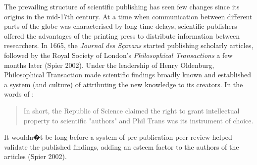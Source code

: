 \documentclass[final,authoryear,3p]{elsarticle-open-drafting}
\begin{document}
The prevailing structure of scientific publishing has seen few changes since its origins in the mid-17th century. At a time when 
communication between different parts of the globe was characterised by long time delays, scientific publishers offered the
advantages of the printing press to distribute information between researchers. In 1665, the {\it Journal des S{\c{c}}avans} started 
publishing scholarly articles, followed by the
Royal Society of London's {\it Philosophical Transactions} a few months later (Spier 2002).
Under the leadership of Henry Oldenburg, Philosophical Transaction made scientific findings broadly known and established a 
system (and culture) of attributing the new knowledge to its creators. In the words of  \href{http://www.webcitation.org/5zE16KjXJ}{\citep{guedon2001ols}}: 
\begin{quote}
In short, the Republic of Science claimed the right to grant intellectual property to scientific "authors" and Phil Trans was its instrument of choice.  
\end{quote}

It wouldn�t be long before a system of pre-publication peer review helped validate the published findings, adding an esteem factor 
to the authors of the articles (Spier 2002). 


\end{document}
